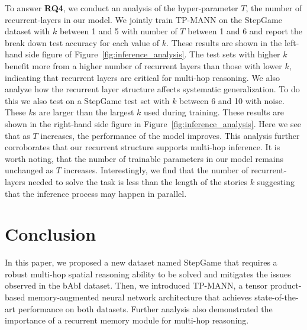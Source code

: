 \documentclass[letterpaper]{article} \usepackage{aaai22}  \usepackage{times}  \usepackage{helvet}  \usepackage{courier}  \usepackage[hyphens]{url}  \usepackage{graphicx} \urlstyle{rm} \def\UrlFont{\rm}  \usepackage{natbib}  \usepackage{caption} \DeclareCaptionStyle{ruled}{labelfont=normalfont,labelsep=colon,strut=off} \frenchspacing  \setlength{\pdfpagewidth}{8.5in}  \setlength{\pdfpageheight}{11in}  \usepackage{algorithm}
\begin{document}
To answer \textbf{RQ4}, 
we conduct an analysis of the hyper-parameter $T$, the number of recurrent-layers in our model. 
We jointly train TP-MANN on the StepGame dataset with $k$ between 1 and 5 with number of $T$ between 1 and 6 and report the break down test accuracy for each value of $k$. 
These results are shown in the left-hand side figure of Figure~\ref{fig:inference_analysis}. 
The test sets with higher $k$ benefit more from a higher number of recurrent layers than those with lower $k$, indicating that recurrent layers are critical for multi-hop reasoning.
We also analyze how the recurrent layer structure affects systematic generalization. 
To do this we also test on a StepGame test set with $k$ between 6 and 10 with noise. These $k$s are larger than the largest $k$ used during training.
These results are shown in the right-hand side figure in Figure~\ref{fig:inference_analysis}.
Here we see that as $T$ increases, the performance of the model improves.
This analysis further corroborates that our recurrent structure supports multi-hop inference. 
It is worth noting, that the number of trainable parameters in our model remains unchanged as $T$ increases. 
Interestingly, we find that the number of recurrent-layers needed to solve the task is less than the length of the stories $k$ suggesting that the inference process may happen in parallel. 


 
\section{Conclusion}
In this paper, we proposed a new dataset named StepGame that requires a robust multi-hop spatial reasoning ability to be solved and mitigates the issues observed in the bAbI dataset. 
Then, we introduced TP-MANN, a tensor product-based memory-augmented neural network architecture that achieves state-of-the-art performance on both datasets. 
Further analysis also demonstrated the importance 
of a recurrent memory module for multi-hop reasoning.

 
\newpage

\end{document}
